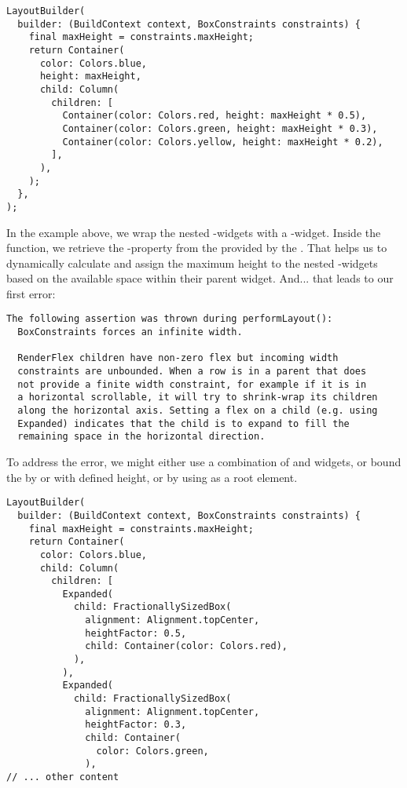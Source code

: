 \begin{lstlisting}
LayoutBuilder(
  builder: (BuildContext context, BoxConstraints constraints) {
    final maxHeight = constraints.maxHeight;
    return Container(
      color: Colors.blue,
      height: maxHeight,
      child: Column(
        children: [
          Container(color: Colors.red, height: maxHeight * 0.5),
          Container(color: Colors.green, height: maxHeight * 0.3),
          Container(color: Colors.yellow, height: maxHeight * 0.2),
        ],
      ),
    );
  },
);
\end{lstlisting}

\noindent In the example above, we wrap the nested -widgets with a -widget. Inside the 
 function, we retrieve the -property from the  provided by the . 
That helps us to dynamically calculate and assign the maximum height to the nested -widgets based on the 
available space within their parent widget. And... that leads to our first error: 

\begin{lstlisting}[language=terminal]
The following assertion was thrown during performLayout():
  BoxConstraints forces an infinite width.

  RenderFlex children have non-zero flex but incoming width 
  constraints are unbounded. When a row is in a parent that does 
  not provide a finite width constraint, for example if it is in 
  a horizontal scrollable, it will try to shrink-wrap its children 
  along the horizontal axis. Setting a flex on a child (e.g. using 
  Expanded) indicates that the child is to expand to fill the 
  remaining space in the horizontal direction.
\end{lstlisting}

\noindent To address the error, we might either use a combination of  and  widgets,
or bound the  by  or  with defined height, or by using  as a root 
element.

\begin{lstlisting}
LayoutBuilder(
  builder: (BuildContext context, BoxConstraints constraints) {
    final maxHeight = constraints.maxHeight;
    return Container(
      color: Colors.blue,
      child: Column(
        children: [
          Expanded(
            child: FractionallySizedBox(
              alignment: Alignment.topCenter,
              heightFactor: 0.5,
              child: Container(color: Colors.red),
            ),
          ),
          Expanded(
            child: FractionallySizedBox(
              alignment: Alignment.topCenter,
              heightFactor: 0.3,
              child: Container(
                color: Colors.green,
              ),
// ... other content
\end{lstlisting}

